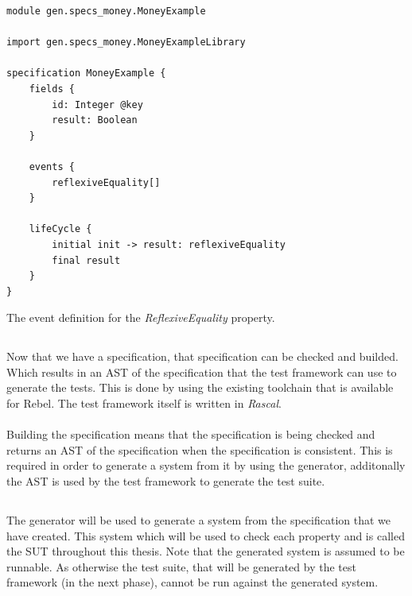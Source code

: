 \FloatBarrier
\begin{sourcecode}[!ht]
\begin{lstlisting}[language=Rebel]
module gen.specs_money.MoneyExample

import gen.specs_money.MoneyExampleLibrary

specification MoneyExample {
	fields {
        id: Integer @key
		result: Boolean
	}

	events {
		reflexiveEquality[]
	}

	lifeCycle {
		initial init -> result:	reflexiveEquality
		final result
	}
}
\end{lstlisting}
\caption{The event definition for the \textit{ReflexiveEquality} property.}
\label{lst:ch3_rebel_specification_oneprop}
\end{sourcecode}
\FloatBarrier

\subsection{\tfPhaseTwo{}}
Now that we have a specification, that specification can be checked and builded. Which results in an AST of the specification that the test framework can use to generate the tests. This is done by using the existing toolchain that is available for Rebel. The test framework itself is written in \textit{Rascal}.\\
\\
Building the specification means that the specification is being checked and returns an AST of the specification when the specification is consistent. This is required in order to generate a system from it by using the generator, additonally the AST is used by the test framework to generate the test suite.

\subsection{\tfPhaseThree{}}
The generator will be used to generate a system from the specification that we have created. This system which will be used to check each property and is called the SUT throughout this thesis. Note that the generated system is assumed to be runnable. As otherwise the test suite, that will be generated by the test framework (in the next phase), cannot be run against the generated system.

